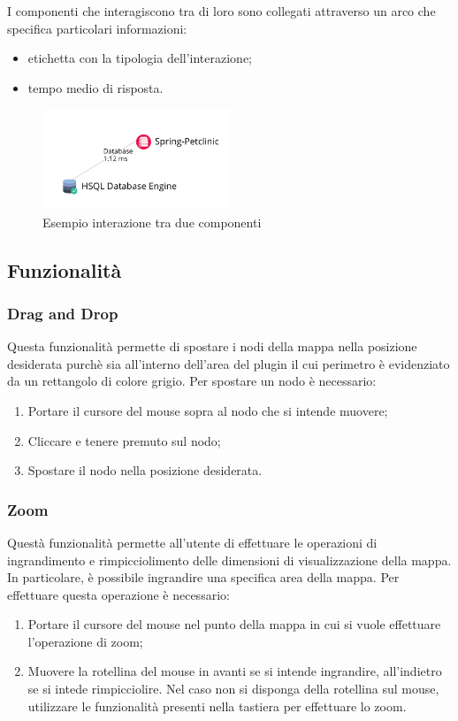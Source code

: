 I componenti che interagiscono tra di loro sono collegati attraverso un arco che specifica particolari informazioni:
\begin{itemize}
	\item etichetta con la tipologia dell'interazione;
	\item tempo medio di risposta.
\end{itemize}

\begin{figure}[H]
	\centering 
	\includegraphics[width=0.5\textwidth]{Images/componenti}
	\caption{Esempio interazione tra due componenti}
\end{figure}

\subsection{Funzionalità}
	\subsubsection {Drag and Drop} 
Questa funzionalità permette di spostare i nodi della mappa nella posizione desiderata purchè sia all'interno dell'area del plugin il cui perimetro è evidenziato da un rettangolo di colore grigio.
Per spostare un nodo è necessario: 
\begin{enumerate}
	\item Portare il cursore del mouse sopra al nodo che si intende muovere;
	\item Cliccare e tenere premuto sul nodo;
	\item Spostare il nodo nella posizione desiderata.
\end{enumerate}


\subsubsection{Zoom}
Questà funzionalità permette all'utente di effettuare le operazioni di ingrandimento e rimpicciolimento delle dimensioni di visualizzazione della mappa. In particolare, è possibile ingrandire una specifica area della mappa.
Per effettuare questa operazione è necessario:
\begin{enumerate}
	\item Portare il cursore del mouse nel punto della mappa in cui si vuole effettuare l'operazione di zoom;
	\item Muovere la rotellina del mouse in avanti se si intende ingrandire, all'indietro se si intede rimpicciolire. Nel caso non si disponga della rotellina sul mouse, utilizzare le funzionalità presenti nella tastiera per effettuare lo zoom.
\end{enumerate}

